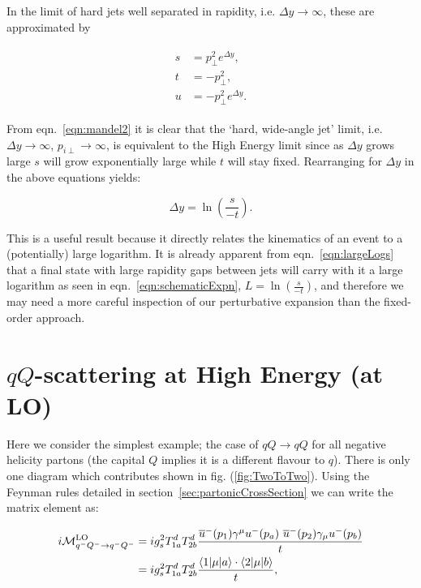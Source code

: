 	In the limit of hard jets well separated in rapidity, i.e. $\Delta y\rightarrow\infty$,
	these are approximated by

	\begin{align}
	\begin{split}
		s &= p_\perp^2 e^{\Delta y},\\
		t &= -p_\perp^2,\\
		u &= -p_\perp^2 e^{\Delta y}.
		\label{eqn:mandel2}
	\end{split}
	\end{align}

	From  eqn.~\eqref{eqn:mandel2} it is clear that the `hard, wide-angle jet' limit, i.e. $\Delta y\to\infty$,
	$p_{i\perp}\to\infty$, is equivalent to the High Energy limit since as $\Delta y$ grows large $s$ will
	grow exponentially large while $t$ will stay fixed.  Rearranging for $\Delta y$ in the above equations yields:

	\begin{equation}
		\Delta y = \ln \left(\frac{s}{-t}\right).
		\label{eqn:largeLogs}
	\end{equation}

	This is a useful result because it directly relates the kinematics of an event to a (potentially)
	large logarithm.  It is already apparent from eqn.~\eqref{eqn:largeLogs} that a final state
	with large rapidity gaps between jets will carry with it a large logarithm as seen in
	eqn.~\eqref{eqn:schematicExpn}, $L=\ln \left(\frac{s}{-t}\right)$, and therefore we may need a
	more careful inspection of our perturbative expansion than the fixed-order approach.

\section{$qQ$-scattering at High Energy (at LO)}
	\label{sec:qQScat}

	Here we consider the simplest example; the case of $qQ\rightarrow qQ$ for all negative helicity partons
	(the capital $Q$ implies it is a different flavour to $q$).  There is only one diagram which contributes shown
	in fig. (\ref{fig:TwoToTwo}).  Using the Feynman rules detailed in section~\ref{sec:partonicCrossSection} we can
	write the matrix element as:

	\begin{align}
		i\mathcal{M}_{q^-Q^-\rightarrow q^-Q^-}^{\text{LO}} &= ig_s^2T^d_{1a}T^d_{2b}
		\frac{\overline{u}^-(p_1)\gamma^\mu
		  u^-(p_a)\text{ }\overline{u}^-(p_2)\gamma_\mu u^-(p_b)}{t}\\
		  &= ig_s^2T^d_{1a}T^d_{2b}\frac{\langle 1 | \mu | a \rangle\cdot\langle 2 | \mu | b \rangle}{t},
		  \label{eqn:similarBrackets}
	\end{align}

